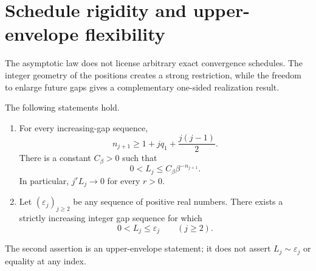 \section{Schedule rigidity and upper-envelope flexibility}
\label{sec:schedules}

The asymptotic law does not license arbitrary exact convergence schedules.  The integer geometry of the positions creates a strong restriction, while the freedom to enlarge future gaps gives a complementary one-sided realization result.

\begin{theorem}
\label{thm:schedules}
The following statements hold.
\begin{enumerate}
    \item For every increasing-gap sequence,
    \begin{equation}
    n_{j+1}\geq 1+jq_1+\frac{j(j-1)}{2}.
    \label{eq:quadratic-position}
    \end{equation}
    There is a constant $C_\beta>0$ such that
    \begin{equation}
    0<L_j\leq C_\beta\beta^{-n_{j+1}}.
    \label{eq:superexp-bound}
    \end{equation}
    In particular, $j^rL_j\to0$ for every $r>0$.
    \item Let $(\varepsilon_j)_{j\geq2}$ be any sequence of positive real numbers.  There exists a strictly increasing integer gap sequence for which
    \begin{equation}
    0<L_j\leq\varepsilon_j\qquad(j\geq2).
    \label{eq:upper-envelope}
    \end{equation}
\end{enumerate}
The second assertion is an upper-envelope statement; it does not assert $L_j\sim\varepsilon_j$ or equality at any index.
\end{theorem}

